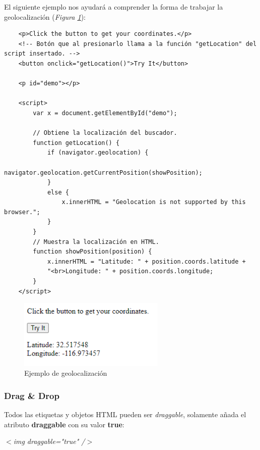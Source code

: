 El siguiente ejemplo nos ayudará a comprender la forma de trabajar la geolocalización (\textit{Figura \ref{fig: 19}}):
\begin{lstlisting}
    <p>Click the button to get your coordinates.</p>
    <!-- Botón que al presionarlo llama a la función "getLocation" del script insertado. -->
    <button onclick="getLocation()">Try It</button>
            
    <p id="demo"></p>

    <script>
        var x = document.getElementById("demo");

        // Obtiene la localización del buscador.
        function getLocation() {
            if (navigator.geolocation) {
                navigator.geolocation.getCurrentPosition(showPosition);
            }
            else { 
                x.innerHTML = "Geolocation is not supported by this browser.";
            }
        }
        // Muestra la localización en HTML.
        function showPosition(position) {
            x.innerHTML = "Latitude: " + position.coords.latitude + 
            "<br>Longitude: " + position.coords.longitude;
        }
    </script>
\end{lstlisting}
\begin{figure}[H]
    \centering
    \caption{Ejemplo de geolocalización}
    \label{fig: 19}
    \includegraphics[width=7cm]{ss_html/geolocation_1.png}
\end{figure}


\subsubsection{Drag \& Drop}

Todos las etiquetas y objetos HTML pueden ser \textit{draggable}, solamente añada el atributo \textbf{draggable} con su valor \textbf{true}:
\begin{center}
    \textit{$<$img draggable="true" /$>$}
\end{center}

